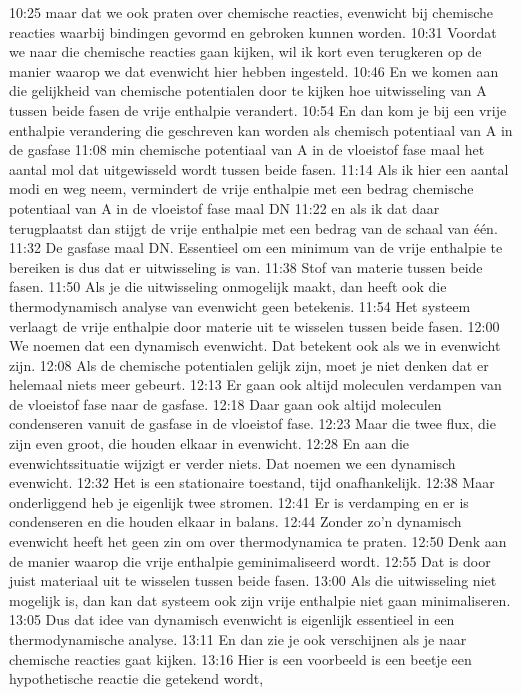 10:25
maar dat we ook praten over chemische reacties, evenwicht bij chemische reacties waarbij bindingen gevormd en gebroken kunnen worden.
10:31
Voordat we naar die chemische reacties gaan kijken, wil ik kort even terugkeren op de manier waarop we dat evenwicht hier hebben ingesteld.
10:46
En we komen aan die gelijkheid van chemische potentialen door te kijken hoe uitwisseling van A tussen beide fasen de vrije enthalpie verandert.
10:54
En dan kom je bij een vrije enthalpie verandering die geschreven kan worden als chemisch potentiaal van A in de gasfase
11:08
min chemische potentiaal van A in de vloeistof fase maal het aantal mol dat uitgewisseld wordt tussen beide fasen.
11:14
Als ik hier een aantal modi en weg neem, vermindert de vrije enthalpie met een bedrag chemische potentiaal van A in de vloeistof fase maal DN
11:22
en als ik dat daar terugplaatst dan stijgt de vrije enthalpie met een bedrag van de schaal van één.
11:32
De gasfase maal DN. Essentieel om een minimum van de vrije enthalpie te bereiken is dus dat er uitwisseling is van.
11:38
Stof van materie tussen beide fasen.
11:50
Als je die uitwisseling onmogelijk maakt, dan heeft ook die thermodynamisch analyse van evenwicht geen betekenis.
11:54
Het systeem verlaagt de vrije enthalpie door materie uit te wisselen tussen beide fasen.
12:00
We noemen dat een dynamisch evenwicht. Dat betekent ook als we in evenwicht zijn.
12:08
Als de chemische potentialen gelijk zijn, moet je niet denken dat er helemaal niets meer gebeurt.
12:13
Er gaan ook altijd moleculen verdampen van de vloeistof fase naar de gasfase.
12:18
Daar gaan ook altijd moleculen condenseren vanuit de gasfase in de vloeistof fase.
12:23
Maar die twee flux, die zijn even groot, die houden elkaar in evenwicht.
12:28
En aan die evenwichtssituatie wijzigt er verder niets. Dat noemen we een dynamisch evenwicht.
12:32
Het is een stationaire toestand, tijd onafhankelijk.
12:38
Maar onderliggend heb je eigenlijk twee stromen.
12:41
Er is verdamping en er is condenseren en die houden elkaar in balans.
12:44
Zonder zo'n dynamisch evenwicht heeft het geen zin om over thermodynamica te praten.
12:50
Denk aan de manier waarop die vrije enthalpie geminimaliseerd wordt.
12:55
Dat is door juist materiaal uit te wisselen tussen beide fasen.
13:00
Als die uitwisseling niet mogelijk is, dan kan dat systeem ook zijn vrije enthalpie niet gaan minimaliseren.
13:05
Dus dat idee van dynamisch evenwicht is eigenlijk essentieel in een thermodynamische analyse.
13:11
En dan zie je ook verschijnen als je naar chemische reacties gaat kijken.
13:16
Hier is een voorbeeld is een beetje een hypothetische reactie die getekend wordt,
